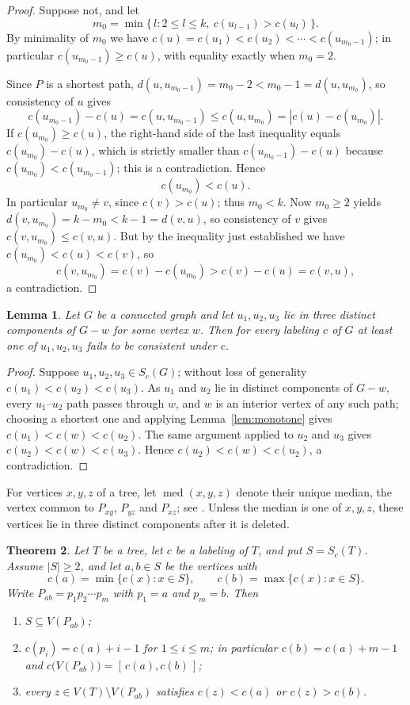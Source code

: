 \documentclass[reqno,10pt]{article}
\newtheorem{theorem}{Theorem}
\newtheorem{lemma}[theorem]{Lemma}
\theoremstyle{definition}
\numberwithin{equation}{section}
\numberwithin{theorem}{section}
\newcommand{\med}{\operatorname{med}}
\begin{document}
\begin{proof}
Suppose not, and let
\[
  m_0=\min\{\,l : 2\le l\le k,\ c(u_{l-1})>c(u_l)\,\}.
\]
By minimality of $m_0$ we have $c(u)=c(u_1)<c(u_2)<\cdots<c(u_{m_0-1})$; in
particular $c(u_{m_0-1})\ge c(u)$, with equality exactly when $m_0=2$.

Since $P$ is a shortest path, $d(u,u_{m_0-1})=m_0-2<m_0-1=d(u,u_{m_0})$, so
consistency of $u$ gives
\[
  c(u_{m_0-1})-c(u)=c(u,u_{m_0-1})\le c(u,u_{m_0})=|c(u)-c(u_{m_0})| .
\]
If $c(u_{m_0})\ge c(u)$, the right-hand side of the last inequality equals
$c(u_{m_0})-c(u)$, which is strictly smaller than $c(u_{m_0-1})-c(u)$ because
$c(u_{m_0})<c(u_{m_0-1})$; this is a contradiction. Hence
\[
  c(u_{m_0})<c(u).
\]
In particular $u_{m_0}\ne v$, since $c(v)>c(u)$; thus $m_0<k$. Now $m_0\ge2$
yields $d(v,u_{m_0})=k-m_0<k-1=d(v,u)$, so consistency of $v$ gives
$c(v,u_{m_0})\le c(v,u)$. But by the inequality just established we have
$c(u_{m_0})<c(u)<c(v)$, so
\[
  c(v,u_{m_0})=c(v)-c(u_{m_0})>c(v)-c(u)=c(v,u),
\]
a contradiction.
\end{proof}

\begin{lemma}
\label{lem:threebranch}
Let $G$ be a connected graph and let $u_1,u_2,u_3$ lie in three distinct
components of $G-w$ for some vertex $w$. Then for every labeling $c$ of $G$ at
least one of $u_1,u_2,u_3$ fails to be consistent under $c$.
\end{lemma}

\begin{proof}
Suppose $u_1,u_2,u_3\in S_c(G)$; without loss of generality
$c(u_1)<c(u_2)<c(u_3)$. As $u_1$ and $u_2$ lie in distinct components of
$G-w$, every $u_1$--$u_2$ path passes through $w$, and $w$ is an interior
vertex of any such path; choosing a shortest one and applying
Lemma~\ref{lem:monotone} gives $c(u_1)<c(w)<c(u_2)$. The same argument applied
to $u_2$ and $u_3$ gives $c(u_2)<c(w)<c(u_3)$. Hence $c(u_2)<c(w)<c(u_2)$, a
contradiction.
\end{proof}

For vertices $x,y,z$ of a tree, let $\med(x,y,z)$ denote their unique median,
the vertex common to $P_{xy}$, $P_{yz}$ and $P_{xz}$; see \cite{Buneman1974}.
Unless the median is one of $x,y,z$, these vertices lie in three distinct
components after it is deleted.

\begin{theorem}
\label{thm:path}
Let $T$ be a tree, let $c$ be a labeling of $T$, and put $S=S_c(T)$. Assume
$|S|\ge2$, and let $a,b\in S$ be the vertices with
\[
  c(a)=\min\{c(x):x\in S\},\qquad c(b)=\max\{c(x):x\in S\}.
\]
Write $P_{ab}=p_1p_2\cdots p_m$ with $p_1=a$ and $p_m=b$. Then
\begin{enumerate}
\item[\textup{(i)}] $S\subseteq V(P_{ab})$;
\item[\textup{(ii)}] $c(p_i)=c(a)+i-1$ for $1\le i\le m$; in particular
$c(b)=c(a)+m-1$ and $c\bigl(V(P_{ab})\bigr)=[\,c(a),c(b)\,]$;
\item[\textup{(iii)}] every $z\in V(T)\setminus V(P_{ab})$ satisfies
$c(z)<c(a)$ or $c(z)>c(b)$.
\end{enumerate}
\end{theorem}
\end{document}
